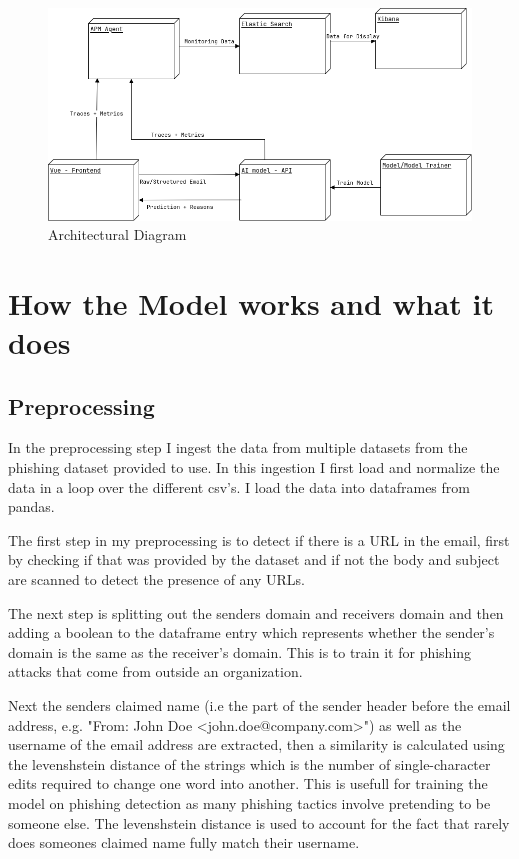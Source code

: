 \documentclass[a4paper,10pt]{article}
\newcounter{req}[subsection]
\begin{document}
\begin{figure}[ht!]
	\centering
	\includegraphics[width=1\textwidth]{doc-img/Arch-Diagram.drawio.png}
	\caption{Architectural Diagram}
	\label{fig:arch-diagram}
\end{figure}

\pagebreak
\section{How the Model works and what it does}

\subsection{Preprocessing}

In the preprocessing step I ingest the data from multiple datasets from the
phishing dataset provided to use. In this ingestion I first load and normalize
the data in a loop over the different csv's. I load the data into dataframes
from pandas. \par

The first step in my preprocessing is to detect if there is a URL
in the email, first by checking if that was provided by the dataset and if not
the body and subject are scanned to detect the presence of any URLs. \par

The next step is splitting out the senders domain and receivers domain and then
adding a boolean to the dataframe entry which represents whether the sender's
domain is the same as the receiver's domain. This is to train it for phishing
attacks that come from outside an organization. \par

Next the senders claimed name (i.e the part of the sender header before the
email address, e.g. "From: John Doe <john.doe@company.com>") as well as the
username of the email address are extracted, then a similarity is calculated
using the levenshstein distance of the strings which is the number of
single-character edits required to change one word into another. This is usefull
for training the model on phishing detection as many phishing tactics involve
pretending to be someone else. The levenshstein distance is used to account for
the fact that rarely does someones claimed name fully match their username. \par
\end{document}
